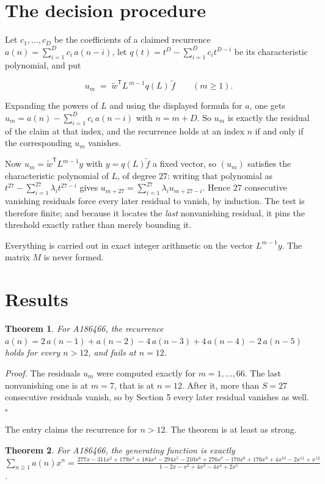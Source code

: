 \documentclass[11pt]{article}
\newtheorem{theorem}{Theorem}
\theoremstyle{definition}
\begin{document}
\section{The decision procedure}

Let $c_1,\dots,c_D$ be the coefficients of a claimed recurrence $a(n) = \sum_{i=1}^{D} c_i\,a(n-i)$, let $q(t) = t^{D} - \sum_{i=1}^{D} c_i t^{D-i}$ be its characteristic polynomial, and put

\[u_m \;=\; \tilde w^{\mathsf T} L^{\,m-1} q(L)\,\tilde f \qquad (m \ge 1).\]

Expanding the powers of $L$ and using the displayed formula for $a$, one gets $u_m = a(n) - \sum_{i=1}^{D} c_i\,a(n-i)$ with $n = m + D$. So $u_m$ is exactly the residual of the claim at that index, and the recurrence holds at an index $n$ if and only if the corresponding $u_m$ vanishes.

Now $u_m = \tilde w^{\mathsf T} L^{m-1} y$ with $y = q(L)\tilde f$ a fixed vector, so $(u_m)$ satisfies the characteristic polynomial of $L$, of degree $27$: writing that polynomial as $t^{27} - \sum_{i=1}^{27} \lambda_i t^{27-i}$ gives $u_{m+27} = \sum_{i=1}^{27} \lambda_i u_{m+27-i}$. Hence $27$ consecutive vanishing residuals force every later residual to vanish, by induction. The test is therefore finite; and because it locates the {\itshape last} nonvanishing residual, it pins the threshold exactly rather than merely bounding it.

Everything is carried out in exact integer arithmetic on the vector $L^{m-1}y$. The matrix $M$ is never formed.

\section{Results}

\begin{theorem} For A186466, the recurrence $a(n) = 2\,a(n-1) + a(n-2) - 4\,a(n-3) + 4\,a(n-4) - 2\,a(n-5)$ holds for every $n > 12$, and fails at $n = 12$.\end{theorem}

{\itshape Proof.} The residuals $u_m$ were computed exactly for $m = 1,\dots,66$. The last nonvanishing one is at $m = 7$, that is at $n = 12$. After it, more than $S = 27$ consecutive residuals vanish, so by Section 5 every later residual vanishes as well. $\square$

The entry claims the recurrence for $n > 12$. The theorem is at least as strong.

\begin{theorem} For A186466, the generating function is exactly $\sum_{n\ge 1} a(n)x^n = \frac{277x - 311x^{2} + 179x^{3} + 184x^{4} - 294x^{5} - 210x^{6} + 276x^{7} - 170x^{8} + 176x^{9} + 4x^{10} - 2x^{11} + x^{12}}{1 - 2x - x^{2} + 4x^{3} - 4x^{4} + 2x^{5}}$.\end{theorem}
\end{document}
